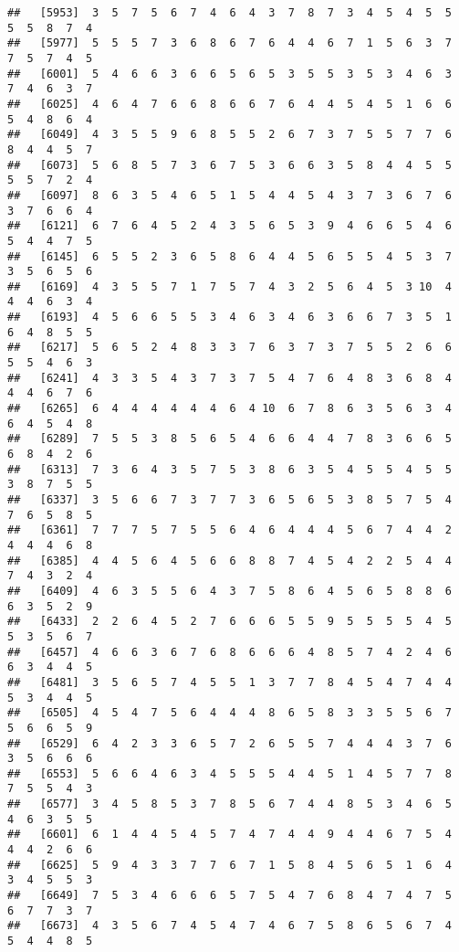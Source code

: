\documentclass[
]{book}
\begin{document}
\begin{verbatim}
##   [5953]  3  5  7  5  6  7  4  6  4  3  7  8  7  3  4  5  4  5  5  5  5  8  7  4
##   [5977]  5  5  5  7  3  6  8  6  7  6  4  4  6  7  1  5  6  3  7  7  5  7  4  5
##   [6001]  5  4  6  6  3  6  6  5  6  5  3  5  5  3  5  3  4  6  3  7  4  6  3  7
##   [6025]  4  6  4  7  6  6  8  6  6  7  6  4  4  5  4  5  1  6  6  5  4  8  6  4
##   [6049]  4  3  5  5  9  6  8  5  5  2  6  7  3  7  5  5  7  7  6  8  4  4  5  7
##   [6073]  5  6  8  5  7  3  6  7  5  3  6  6  3  5  8  4  4  5  5  5  5  7  2  4
##   [6097]  8  6  3  5  4  6  5  1  5  4  4  5  4  3  7  3  6  7  6  3  7  6  6  4
##   [6121]  6  7  6  4  5  2  4  3  5  6  5  3  9  4  6  6  5  4  6  5  4  4  7  5
##   [6145]  6  5  5  2  3  6  5  8  6  4  4  5  6  5  5  4  5  3  7  3  5  6  5  6
##   [6169]  4  3  5  5  7  1  7  5  7  4  3  2  5  6  4  5  3 10  4  4  4  6  3  4
##   [6193]  4  5  6  6  5  5  3  4  6  3  4  6  3  6  6  7  3  5  1  6  4  8  5  5
##   [6217]  5  6  5  2  4  8  3  3  7  6  3  7  3  7  5  5  2  6  6  5  5  4  6  3
##   [6241]  4  3  3  5  4  3  7  3  7  5  4  7  6  4  8  3  6  8  4  4  4  6  7  6
##   [6265]  6  4  4  4  4  4  4  6  4 10  6  7  8  6  3  5  6  3  4  6  4  5  4  8
##   [6289]  7  5  5  3  8  5  6  5  4  6  6  4  4  7  8  3  6  6  5  6  8  4  2  6
##   [6313]  7  3  6  4  3  5  7  5  3  8  6  3  5  4  5  5  4  5  5  3  8  7  5  5
##   [6337]  3  5  6  6  7  3  7  7  3  6  5  6  5  3  8  5  7  5  4  7  6  5  8  5
##   [6361]  7  7  7  5  7  5  5  6  4  6  4  4  4  5  6  7  4  4  2  4  4  4  6  8
##   [6385]  4  4  5  6  4  5  6  6  8  8  7  4  5  4  2  2  5  4  4  7  4  3  2  4
##   [6409]  4  6  3  5  5  6  4  3  7  5  8  6  4  5  6  5  8  8  6  6  3  5  2  9
##   [6433]  2  2  6  4  5  2  7  6  6  6  5  5  9  5  5  5  5  4  5  5  3  5  6  7
##   [6457]  4  6  6  3  6  7  6  8  6  6  6  4  8  5  7  4  2  4  6  6  3  4  4  5
##   [6481]  3  5  6  5  7  4  5  5  1  3  7  7  8  4  5  4  7  4  4  5  3  4  4  5
##   [6505]  4  5  4  7  5  6  4  4  4  8  6  5  8  3  3  5  5  6  7  5  6  6  5  9
##   [6529]  6  4  2  3  3  6  5  7  2  6  5  5  7  4  4  4  3  7  6  3  5  6  6  6
##   [6553]  5  6  6  4  6  3  4  5  5  5  4  4  5  1  4  5  7  7  8  7  5  5  4  3
##   [6577]  3  4  5  8  5  3  7  8  5  6  7  4  4  8  5  3  4  6  5  4  6  3  5  5
##   [6601]  6  1  4  4  5  4  5  7  4  7  4  4  9  4  4  6  7  5  4  4  4  2  6  6
##   [6625]  5  9  4  3  3  7  7  6  7  1  5  8  4  5  6  5  1  6  4  3  4  5  5  3
##   [6649]  7  5  3  4  6  6  6  5  7  5  4  7  6  8  4  7  4  7  5  6  7  7  3  7
##   [6673]  4  3  5  6  7  4  5  4  7  4  6  7  5  8  6  5  6  7  4  5  4  4  8  5

\end{verbatim}
\end{document}
